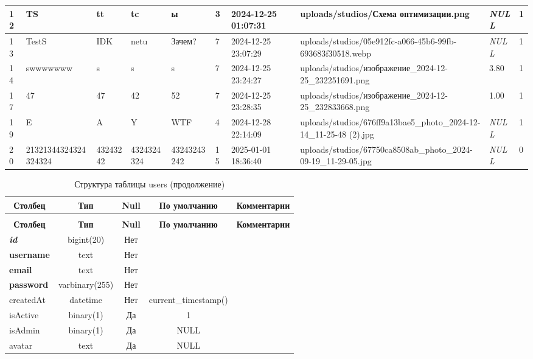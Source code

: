 \begin{longtable}{|l|l|l|l|l|l|l|l|l|l|}
12 & TS & tt & tc & ы & 3 & 2024-12-25 01:07:31 & uploads/studios/Схема оптимизации.png & \textit{NULL} & 1 \\ \hline 
13 & TestS & IDK & netu & Зачем? & 7 & 2024-12-25 23:07:29 & uploads/studios/05e912fc-a066-45b6-99fb-693683f30518.webp & \textit{NULL} & 1 \\ \hline 
14 & swwwwwww & s & s & s & 7 & 2024-12-25 23:24:27 & uploads/studios/изображение\_2024-12-25\_232251691.png & 3.80 & 1 \\ \hline 
17 & 47 & 47 & 42 & 52 & 7 & 2024-12-25 23:28:35 & uploads/studios/изображение\_2024-12-25\_232833668.png & 1.00 & 1 \\ \hline 
19 & E & A & Y & WTF & 4 & 2024-12-28 22:14:09 & uploads/studios/676ff9a13bae5\_photo\_2024-12-14\_11-25-48 (2).jpg & \textit{NULL} & 1 \\ \hline 
20 & 21321344324324324324 & 43243242 & 4324324324 & 43243243242 & 15 & 2025-01-01 18:36:40 & uploads/studios/67750ca8508ab\_photo\_2024-09-19\_11-29-05.jpg & \textit{NULL} & 0 \\ \hline 
 \end{longtable}

%
%
 \begin{longtable}{|l|c|c|c|l|} 
 \caption{Структура таблицы users} \label{tab:users-structure} \\
 \hline \multicolumn{1}{|c|}{\textbf{Столбец}} & \multicolumn{1}{|c|}{\textbf{Тип}} & \multicolumn{1}{|c|}{\textbf{Null}} & \multicolumn{1}{|c|}{\textbf{По умолчанию}} & \multicolumn{1}{|c|}{\textbf{Комментарии}} \\ \hline \hline
\endfirsthead
 \caption{Структура таблицы users (продолжение)} \\ 
 \hline \multicolumn{1}{|c|}{\textbf{Столбец}} & \multicolumn{1}{|c|}{\textbf{Тип}} & \multicolumn{1}{|c|}{\textbf{Null}} & \multicolumn{1}{|c|}{\textbf{По умолчанию}} & \multicolumn{1}{|c|}{\textbf{Комментарии}} \\ \hline \hline \endhead \endfoot 
\textbf{\textit{id}} & bigint(20) & Нет &  \\ \hline 
\textbf{username} & text & Нет &  \\ \hline 
\textbf{email} & text & Нет &  \\ \hline 
\textbf{password} & varbinary(255) & Нет &  \\ \hline 
createdAt & datetime & Нет & current\_timestamp() \\ \hline 
isActive & binary(1) & Да & 1 \\ \hline 
isAdmin & binary(1) & Да & NULL \\ \hline 
avatar & text & Да & NULL \\ \hline 
 \end{longtable}

